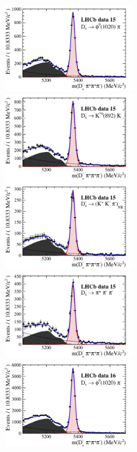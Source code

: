 \begin{figure}[h]
\includegraphics[height=!,width=0.5\textwidth]{figs/norm_y15_phipi.pdf}
\includegraphics[height=!,width=0.5\textwidth]{figs/norm_y15_KsK.pdf}
\includegraphics[height=!,width=0.5\textwidth]{figs/norm_y15_KKpi_NR.pdf}
\includegraphics[height=!,width=0.5\textwidth]{figs/norm_y15_pipipi.pdf}
\includegraphics[height=!,width=0.5\textwidth]{figs/norm_y16_phipi.pdf}

\end{figure}
